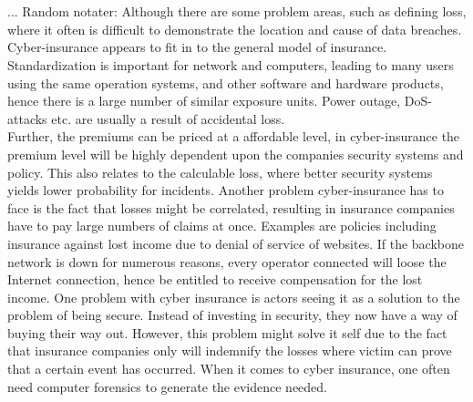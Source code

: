  


 



\\
\\
... Random notater:
 Although there are some problem areas, such as defining loss, where it often is difficult to
  demonstrate the location and cause of data breaches. Cyber-insurance appears to fit in to
   the general model of insurance. Standardization is important for network and computers, leading to
    many users using the same operation systems, and other software and hardware products, 
    hence there is a large number of similar exposure units. Power outage, DoS-attacks etc. 
    are usually a result of accidental loss.
 \\ Further, the premiums can be priced at a affordable level, in cyber-insurance the premium level
  will be highly dependent upon the companies security systems and policy.
   This also relates to the calculable loss, where better security systems
    yields lower probability for incidents. \cite{robinson2012incentives}
 Another problem cyber-insurance has to face is the fact that losses might be correlated, 
 resulting in insurance companies have to pay large numbers of claims at once. Examples are 
 policies including insurance against lost income due to denial of service of websites. 
 If the backbone network is down for numerous reasons, 
 every operator connected will loose the Internet connection, 
 hence be entitled to receive compensation for the lost income. 
 One problem with cyber insurance is actors seeing it as a solution to the problem of being secure. Instead of investing in security, they now have a way of buying their way out. However, this problem might solve it self due to the fact that insurance companies only will indemnify the losses where victim can prove that a certain event has occurred. When it comes to cyber insurance, one often need computer forensics to generate the evidence needed. 








